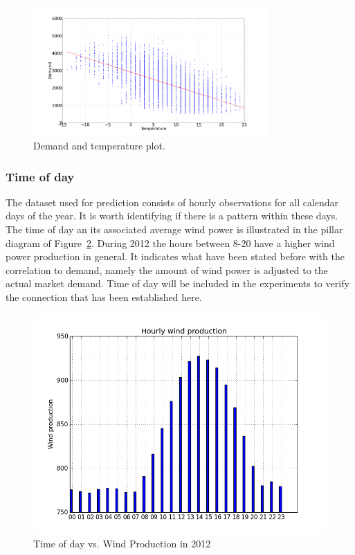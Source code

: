 \begin{figure}[H]
\centering
\includegraphics[width=0.8\textwidth ,natwidth=410,natheight=237]{billeder/energy_price_plots/consump_temp.png}
\caption{Demand and temperature plot.}
\label{fig:consump_temp_green}
\end{figure}

\subsubsection{Time of day}
\label{sec:greenTOD}
The dataset used for prediction consists of hourly observations for all calendar days of the year. It is worth identifying if there is a pattern within these days. The time of day an its associated average wind power is illustrated in the pillar diagram of Figure~\ref{fig:hourly_wind_production}. During 2012 the hours between 8-20 have a higher wind power production in general. It indicates what have been stated before with the correlation to demand, namely the amount of wind power is adjusted to the actual market demand. Time of day will be included in the experiments to verify the connection that has been established here. 

\begin{figure}[H]
\centering
\includegraphics[width=0.99\linewidth,natwidth=898,natheight=587]{billeder/hourly_wind_production.png}
\caption{Time of day vs. Wind Production in 2012}
\label{fig:hourly_wind_production}
\end{figure}

